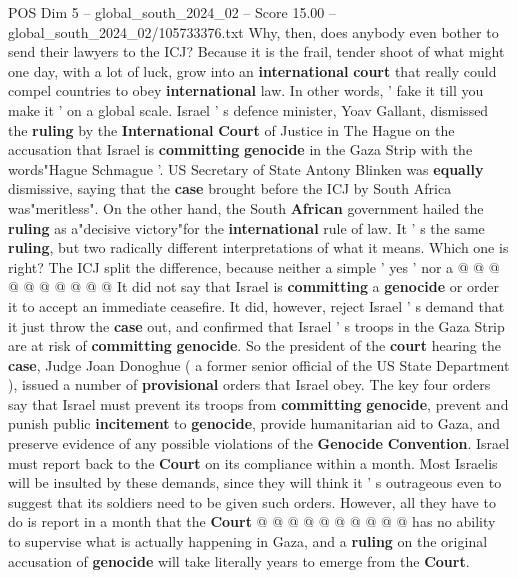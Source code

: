 \begin{textsample}{POS Dim 5 – global\_south\_2024\_02 – Score 15.00 – global\_south\_2024\_02/105733376.txt}  \label{ex:f5_pos_192}
Why, then, does anybody even bother to send their lawyers to the ICJ?
Because it is the frail, tender shoot of what might one day, with a lot of luck, grow into an \textbf{international} \textbf{court} that really could compel countries to obey \textbf{international} law.
In other words, ' fake it till you make it ' on a global scale.
Israel ' s defence minister, Yoav Gallant, dismissed the \textbf{ruling} by the \textbf{International} \textbf{Court} of Justice in The Hague on the accusation that Israel is \textbf{committing} \textbf{genocide} in the Gaza Strip with the words"Hague Schmague '.
US Secretary of State Antony Blinken was \textbf{equally} dismissive, saying that the \textbf{case} brought before the ICJ by South Africa was"meritless".
On the other hand, the South \textbf{African} government hailed the \textbf{ruling} as a"decisive victory"for the \textbf{international} rule of law.
It ' s the same \textbf{ruling}, but two radically different interpretations of what it means.
Which one is right?
The ICJ split the difference, because neither a simple ' yes ' nor a @ @ @ @ @ @ @ @ @ @ It did not say that Israel is \textbf{committing} a \textbf{genocide} or order it to accept an immediate ceasefire.
It did, however, reject Israel ' s demand that it just throw the \textbf{case} out, and confirmed that Israel ' s troops in the Gaza Strip are at risk of \textbf{committing} \textbf{genocide}.
So the president of the \textbf{court} hearing the \textbf{case}, Judge Joan Donoghue ( a former senior official of the US State Department ), issued a number of \textbf{provisional} orders that Israel obey.
The key four orders say that Israel must prevent its troops from \textbf{committing} \textbf{genocide}, prevent and punish public \textbf{incitement} to \textbf{genocide}, provide humanitarian aid to Gaza, and preserve evidence of any possible violations of the \textbf{Genocide} \textbf{Convention}.
Israel must report back to the \textbf{Court} on its compliance within a month.
Most Israelis will be insulted by these demands, since they will think it ' s outrageous even to suggest that its soldiers need to be given such orders.
However, all they have to do is report in a month that the \textbf{Court} @ @ @ @ @ @ @ @ @ @ has no ability to supervise what is actually happening in Gaza, and a \textbf{ruling} on the original accusation of \textbf{genocide} will take literally years to emerge from the \textbf{Court}.

\end{textsample}
